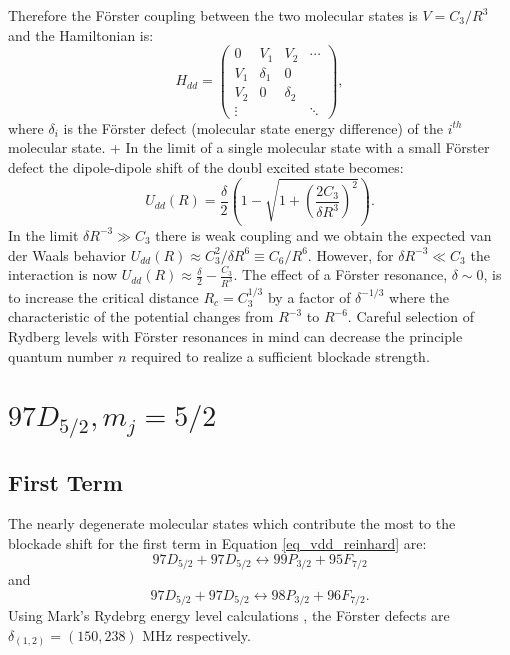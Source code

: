 Therefore the F\"{o}rster coupling between the two molecular states is $V = C_3/R^{3}$ and the Hamiltonian is:
\begin{equation}
  \label{eq_hdd}
  H_{dd} =  
    \left( 
      \begin{array}{cccc}
        0      & V_1      & V_2      & \cdots \\
        V_1    & \delta_1 & 0        & \\
        V_2    & 0        & \delta_2 & \\
        \vdots &          &          & \ddots
      \end{array} 
    \right),
\end{equation}
where $\delta_i$ is the F\"{o}rster defect (molecular state energy difference) of the $i^{th}$ molecular state.
+
In the limit of a single molecular state with a small F\"{o}rster defect the dipole-dipole shift of the doubl excited state becomes:
\begin{equation}
  \label{eq_vddsimple}
  U_{dd}(R) = \frac{\delta}{2}\left(1 - \sqrt{1 + \left(\frac{2C_3}{\delta R^{3}}\right)^2}\right).
\end{equation}
In the limit $\delta R^{-3}\gg C_3$ there is weak coupling and we obtain the expected van der Waals behavior $U_{dd}(R) \approx C_3^2/\delta R^{6} \equiv C_6/R^{6}$.
However, for $\delta R^{-3}\ll C_3$ the interaction is now $U_{dd}(R) \approx \frac{\delta}{2} - \frac{C_3}{R^{3}}$.
The effect of a F\"{o}rster resonance, $\delta \sim 0$, is to increase the critical distance $R_c = C_3^{1/3}$ by a factor of $\delta^{-1/3}$ where the characteristic of the potential changes from $R^{-3}$ to $R^{-6}$.
Careful selection of Rydberg levels with F\"{o}rster resonances in mind can decrease the principle quantum number $n$ required to realize a sufficient blockade strength.

\section{$97D_{5/2}, m_j = 5/2$}

\subsection{First Term}
The nearly degenerate molecular states which contribute the most to the blockade shift for the first term in Equation \ref{eq_vdd_reinhard} are:
\begin{equation}
  \label{eq_rydmol1}
  97D_{5/2} + 97D_{5/2} \leftrightarrow 99P_{3/2} + 95F_{7/2}
\end{equation}
and
\begin{equation}
  \label{eq_rydmol1}
  97D_{5/2} + 97D_{5/2} \leftrightarrow 98P_{3/2} + 96F_{7/2}.
\end{equation}
Using Mark's Rydebrg energy level calculations \cite{}, the F\"{o}rster defects are $\delta_{(1,2)}=(150,238)$ MHz respectively.

